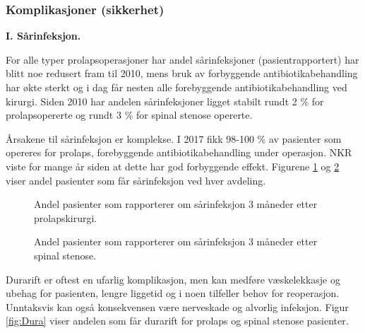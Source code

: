 \documentclass [norsk,a4paper,twoside]{article}\usepackage[]{graphicx}\usepackage[]{color}
\begin{document}
\subsubsection{Komplikasjoner (sikkerhet)}

\textbf{I. Sårinfeksjon.}

For alle typer prolapsoperasjoner har
andel sårinfeksjoner (pasientrapportert) har blitt noe redusert fram til 2010, mens bruk av  forbyggende antibiotikabehandling har økte sterkt og i dag får nesten alle forebyggende antibiotikabehandling ved kirurgi. Siden 2010 har andelen sårinfeksjoner ligget stabilt rundt 2 \% for prolapsopererte og rundt 3 \% for spinal stenose opererte.



Årsakene til sårinfeksjon er komplekse. I 2017 fikk 98-100 \% av pasienter som
opereres for prolaps, forebyggende antibiotikabehandling under operasjon. NKR
viste for mange år siden at dette har god forbyggende effekt. Figurene \ref{fig:KpInfAvdPro} og \ref{fig:KpInfAvdSS} viser andel pasienter som får sårinfeksjon ved hver avdeling.

\begin{figure}[ht]
\caption{\label{fig:KpInfAvdPro} Andel pasienter som rapporterer om sårinfeksjon 3 måneder etter
prolapskirurgi.}
\end{figure}

\begin{figure}[ht]
\caption{\label{fig:KpInfAvdSS} Andel pasienter som rapporterer om sårinfeksjon 3 måneder etter
spinal stenose.}
\end{figure}




Durarift er oftest en ufarlig komplikasjon, men kan medføre væskelekkasje og
ubehag for pasienten, lengre liggetid og i noen tilfeller behov for reoperasjon.
Unntaksvis kan også konsekvensen være nerveskade og alvorlig infeksjon. Figur \ref{fig:Dura} viser andelen som får durarift for prolaps og spinal stenose pasienter.
\end{document}
